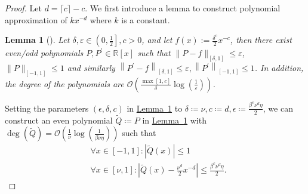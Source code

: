 \documentclass[journal]{IEEEtran}
\newtheorem{lemma}{Lemma}
\newcommand{\lem}[1]{\hyperref[lem:#1]{Lemma~\ref*{lem:#1}}}
\begin{document}
\begin{proof}
  Let $d = \lceil c \rceil -c$.
  We first introduce a lemma to construct polynomial approximation of $kx^{-d}$ where $k$ is a constant.
  \begin{lemma}[{\cite[Corollary 67, Polynomial approximations of negative power functions]{gilyen2019singular}}] Let $\delta, \varepsilon \in\left(0, \frac{1}{2}\right], c>0$, and let $f(x):=\frac{\delta^{c}}{2} x^{-c}$, then there exist even/odd polynomials $P, P^{\prime} \in \mathbb{R}[x]$ such that $\|P-f\|_{[\delta, 1]} \leq \varepsilon$, $\|P\|_{[-1,1]} \leq 1$ and similarly $\left\|P^{\prime}-f\right\|_{[\delta, 1]} \leq \varepsilon,\left\|P^{\prime}\right\|_{[-1,1]} \leq 1$. In addition, the degree of the polynomials
  are $\mathcal{O}\left(\frac{\max [1, c]}{\delta} \log \left(\frac{1}{\varepsilon}\right)\right)$.
  \label{lem:poly-approx-nega-power}
\end{lemma}

Setting the parameters $(\epsilon,\delta,c)$ in \lem{poly-approx-nega-power} to $\delta \coloneqq \nu, c \coloneqq d, \epsilon \coloneqq \frac{\beta^{c}\nu^{d}\eta}{2}$, we can construct an even polynomial $\tilde{Q}\coloneqq P$ in \lem{poly-approx-nega-power} with $\deg(\tilde{Q}) = \mathcal{O}\left(\frac{1}{\nu}\log(\frac{1}{\beta\nu\eta})\right)$ such that  %
\begin{align}
      & \forall x \in [-1,1]:        |\tilde{Q}(x)| \le 1                                                      \nonumber\\
      & \forall x \in [\nu,1]:       |\tilde{Q}(x)-\frac{\nu^{d}}{2}x^{-d}|\le \frac{\beta^{c}\nu^{d}\eta}{2}.
\end{align}


\end{proof}
\end{document}
